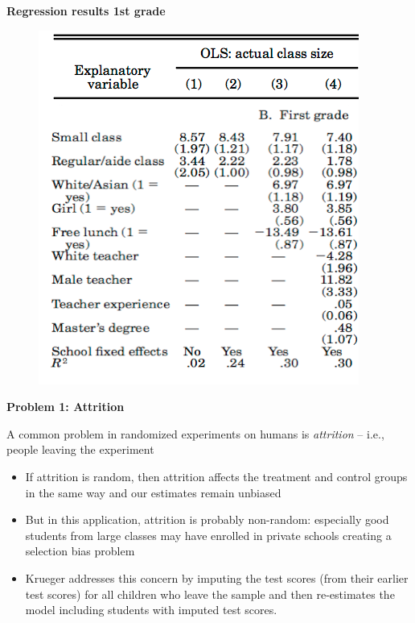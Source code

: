 \documentclass{beamer}
\begin{document}
\begin{frame}[plain]
	\begin{center}
	\textbf{Regression results 1st grade}
	\end{center}
	
	\begin{figure}
	\includegraphics{./lecture_includes/krueger1999_table5b.pdf}
	\end{figure}
\end{frame}

\begin{frame}[plain]
	\begin{center}
	\textbf{Problem 1: Attrition}
	\end{center}
	
A common problem in randomized experiments on humans is \emph{attrition} -- i.e., people leaving the experiment
	\begin{itemize}		
	\item If attrition is random, then attrition affects the treatment and control groups in the same way and our estimates remain unbiased
	\item But in this application, attrition is probably non-random: especially good students from large classes may have enrolled in private schools creating a selection bias problem
	\item Krueger addresses this concern by imputing the test scores (from their earlier test scores) for all children who leave the sample and then re-estimates the model including students with imputed test scores.
	\end{itemize}
\end{frame}
\end{document}
